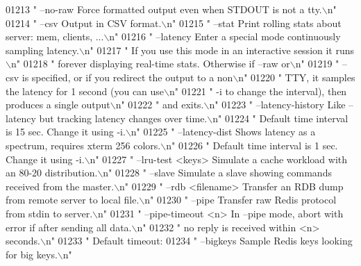 \begin{DoxyCode}
{{{{{{{{{{{{{{{{{{{{{{{{{{{{{{{{{01213 \textcolor{stringliteral}{"  --no-raw           Force formatted output even when STDOUT is not a tty.\(\backslash\)n"}
01214 \textcolor{stringliteral}{"  --csv              Output in CSV format.\(\backslash\)n"}
01215 \textcolor{stringliteral}{"  --stat             Print rolling stats about server: mem, clients, ...\(\backslash\)n"}
01216 \textcolor{stringliteral}{"  --latency          Enter a special mode continuously sampling latency.\(\backslash\)n"}
01217 \textcolor{stringliteral}{"                     If you use this mode in an interactive session it runs\(\backslash\)n"}
01218 \textcolor{stringliteral}{"                     forever displaying real-time stats. Otherwise if --raw or\(\backslash\)n"}
01219 \textcolor{stringliteral}{"                     --csv is specified, or if you redirect the output to a non\(\backslash\)n"}
01220 \textcolor{stringliteral}{"                     TTY, it samples the latency for 1 second (you can use\(\backslash\)n"}
01221 \textcolor{stringliteral}{"                     -i to change the interval), then produces a single output\(\backslash\)n"}
01222 \textcolor{stringliteral}{"                     and exits.\(\backslash\)n"}
01223 \textcolor{stringliteral}{"  --latency-history  Like --latency but tracking latency changes over time.\(\backslash\)n"}
01224 \textcolor{stringliteral}{"                     Default time interval is 15 sec. Change it using -i.\(\backslash\)n"}
01225 \textcolor{stringliteral}{"  --latency-dist     Shows latency as a spectrum, requires xterm 256 colors.\(\backslash\)n"}
01226 \textcolor{stringliteral}{"                     Default time interval is 1 sec. Change it using -i.\(\backslash\)n"}
01227 \textcolor{stringliteral}{"  --lru-test <keys>  Simulate a cache workload with an 80-20 distribution.\(\backslash\)n"}
01228 \textcolor{stringliteral}{"  --slave            Simulate a slave showing commands received from the master.\(\backslash\)n"}
01229 \textcolor{stringliteral}{"  --rdb <filename>   Transfer an RDB dump from remote server to local file.\(\backslash\)n"}
01230 \textcolor{stringliteral}{"  --pipe             Transfer raw Redis protocol from stdin to server.\(\backslash\)n"}
01231 \textcolor{stringliteral}{"  --pipe-timeout <n> In --pipe mode, abort with error if after sending all data.\(\backslash\)n"}
01232 \textcolor{stringliteral}{"                     no reply is received within <n> seconds.\(\backslash\)n"}
01233 \textcolor{stringliteral}{"                     Default timeout: %
01234 \textcolor{stringliteral}{"  --bigkeys          Sample Redis keys looking for big keys.\(\backslash\)n"}
}}}}}}}}}}}}}}}}}}}}}}}}}}}}}}}}}}
\end{DoxyCode}
